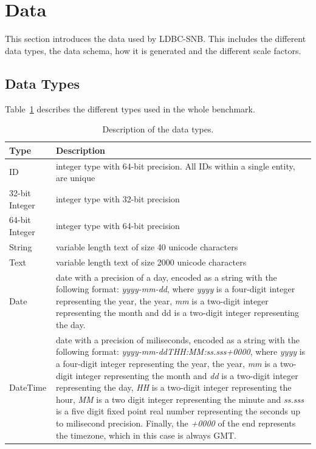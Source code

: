
\section{Data}\label{section:data}

This section introduces the data used by LDBC-SNB. This includes the different
data types, the data schema, how it is generated and the different scale
factors.

\subsection{Data Types}
Table~\ref{table:types} describes the different types used in the whole benchmark.

\begin{table}[h]
\centering
\begin{tabular}{|p{2.5cm}|p{13cm}|}
    \hline
    \textbf{Type} & \textbf{Description} \\
    \hline
    ID &  integer type with 64-bit precision. All IDs within a single entity, are unique\\
    \hline
    32-bit Integer &  integer type with 32-bit precision\\
    \hline
    64-bit Integer &  integer type with 64-bit precision\\
    \hline
    String & variable length text of size 40 unicode characters\\
    \hline
    Text &  variable length text of size 2000 unicode characters\\
    \hline
    Date &  date with a precision of a day, encoded as a string with the following format: \textit{yyyy-mm-dd}, where \textit{yyyy} is a four-digit integer representing the year,
    the year, \textit{mm} is a two-digit integer representing the month and dd is a two-digit integer representing the day. \\
    \hline
    DateTime &  date with a precision of miliseconds, encoded as a string with the following format: \textit{yyyy-mm-ddTHH:MM:ss.sss+0000}, where \textit{yyyy} is a four-digit integer representing the year,
    the year, \textit{mm} is a two-digit integer representing the month and \textit{dd} is a two-digit integer representing the day, \textit{HH} is a two-digit integer representing the hour, \textit{MM} is a two 
    digit integer representing the minute and \textit{ss.sss} is a five digit fixed point real number representing the seconds up to milisecond precision. Finally, the \textit{+0000} of the end represents the
    timezone, which in this case is always GMT.\\
    \hline
\end{tabular}
\caption{Description of the data types.}
\label{table:types}
\end{table}


